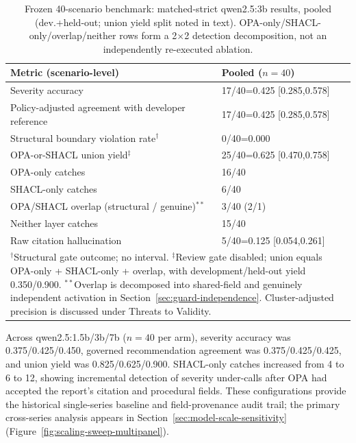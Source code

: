 \documentclass[journal,twoside,web]{ieeecolor}
\newif\ifscalingtable \scalingtablefalse
\newif\ifscalingplot  \scalingplotfalse
\begin{document}
\begin{table}[t]
\centering
\caption{Frozen 40-scenario benchmark: matched-strict qwen2.5:3b results, pooled (dev.+held-out; union yield split noted in text). OPA-only/SHACL-only/overlap/neither rows form a 2$\times$2 detection decomposition, not an independently re-executed ablation.}
\label{tab:independent-scenario-level}
\scriptsize
\setlength{\tabcolsep}{2.0pt}
\begin{tabular}{p{}p{}}
\hline
\textbf{Metric (scenario-level)} & \textbf{Pooled ($n=40$)} \\
\hline
Severity accuracy & 17/40=0.425 [0.285,0.578] \\
Policy-adjusted agreement with developer reference & 17/40=0.425 [0.285,0.578] \\
Structural boundary violation rate$^\dagger$ & 0/40=0.000 \\
OPA-or-SHACL union yield$^\ddagger$ & 25/40=0.625 [0.470,0.758] \\
OPA-only catches & 16/40 \\
SHACL-only catches & 6/40 \\
OPA/SHACL overlap (structural / genuine)$^{**}$ & 3/40 (2/1) \\
Neither layer catches & 15/40 \\
Raw citation hallucination & 5/40=0.125 [0.054,0.261] \\
\hline
\multicolumn{2}{p{0.94\columnwidth}}{\scriptsize $^\dagger$Structural gate outcome; no interval. $^\ddagger$Review gate disabled; union equals OPA-only + SHACL-only + overlap, with development/held-out yield 0.350/0.900. $^{**}$Overlap is decomposed into shared-field and genuinely independent activation in Section~\ref{sec:guard-independence}. Cluster-adjusted precision is discussed under Threats to Validity.} \\
\end{tabular}
\end{table}

Across qwen2.5:1.5b/3b/7b ($n=40$ per arm), severity accuracy was 0.375/0.425/0.450, governed recommendation agreement was 0.375/0.425/0.425, and union yield was 0.825/0.625/0.900. SHACL-only catches increased from 4 to 6 to 12, showing incremental detection of severity under-calls after OPA had accepted the report's citation and procedural fields. These configurations provide the historical single-series baseline and field-provenance audit trail; the primary cross-series analysis appears in Section~\ref{sec:model-scale-sensitivity}\ifscalingtable{} (Table~\ref{tab:scaling-sweep})\fi\ifscalingplot{} (Figure~\ref{fig:scaling-sweep-multipanel})\fi.
\end{document}
